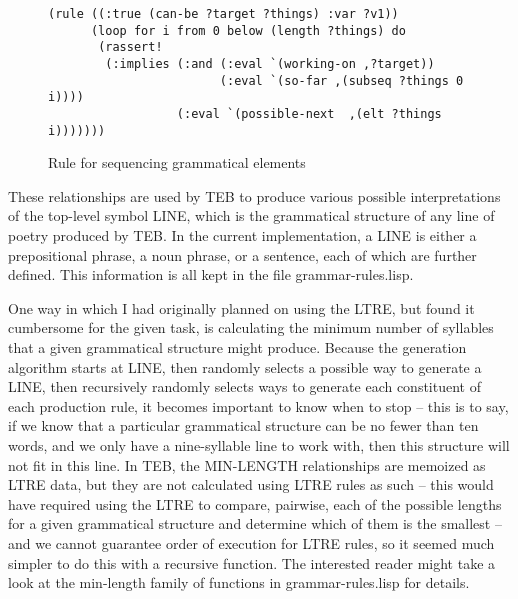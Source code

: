 \documentclass[12pt]{article}
\begin{document}
\begin{figure}
\begin{center}
\begin{verbatim}
(rule ((:true (can-be ?target ?things) :var ?v1))
      (loop for i from 0 below (length ?things) do
       (rassert!
        (:implies (:and (:eval `(working-on ,?target))
                        (:eval `(so-far ,(subseq ?things 0 i))))
                  (:eval `(possible-next  ,(elt ?things i)))))))
\end{verbatim}
\caption{Rule for sequencing grammatical elements}
\label{sequence-rule}
\end{center}
\end{figure}

\bigskip
These relationships are used by TEB to produce various possible
interpretations of the top-level symbol LINE, which is the grammatical
structure of any line of poetry produced by TEB. In the current
implementation, a LINE is either a prepositional phrase, a noun phrase, or
a sentence, each of which are further defined. This information is all kept
in the file grammar-rules.lisp.

\bigskip
One way in which I had originally planned on using the LTRE, but found it
cumbersome for the given task, is calculating the minimum number of
syllables that a given grammatical structure might produce. Because the
generation algorithm starts at LINE, then randomly selects a possible way
to generate a LINE, then recursively randomly selects ways to generate each
constituent of each production rule, it becomes important to know when to
stop -- this is to say, if we know that a particular grammatical structure
can be no fewer than ten words, and we only have a nine-syllable line to
work with, then this structure will not fit in this line. In TEB, the
MIN-LENGTH relationships are memoized as LTRE data, but they are not
calculated using LTRE rules as such -- this would have required using the
LTRE to compare, pairwise, each of the possible lengths for a given
grammatical structure and determine which of them is the smallest -- and we
cannot guarantee order of execution for LTRE rules, so it seemed much
simpler to do this with a recursive function. The interested reader might
take a look at the min-length family of functions in grammar-rules.lisp for
details.
\end{document}
